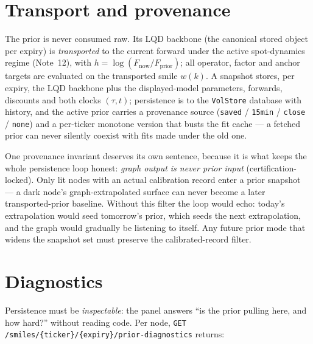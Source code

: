 \documentclass[11pt]{article}
\begin{document}
\section{Transport and provenance}
\label{sec:transport}

The prior is never consumed raw. Its LQD backbone (the canonical stored
object per expiry) is \emph{transported} to the current forward under the
active spot-dynamics regime (Note~12), with
$h=\log(F_{\text{now}}/F_{\text{prior}})$; all operator, factor and anchor
targets are evaluated on the transported smile $w(k)$. A snapshot stores, per
expiry, the LQD backbone plus the displayed-model parameters, forwards,
discounts and both clocks $(\tau,t)$; persistence is to the \texttt{VolStore}
database with history, and the active prior carries a provenance source
(\texttt{saved} / \texttt{15min} / \texttt{close} / \texttt{none}) and a
per-ticker monotone version that busts the fit cache --- a fetched prior can
never silently coexist with fits made under the old one.

One provenance invariant deserves its own sentence, because it is what keeps
the whole persistence loop honest: \emph{graph output is never prior input}
(certification-locked). Only lit nodes with an actual calibration record
enter a prior snapshot --- a dark node's graph-extrapolated surface can
never become a later transported-prior baseline. Without this filter the
loop would echo: today's extrapolation would seed tomorrow's prior, which
seeds the next extrapolation, and the graph would gradually be listening to
itself. Any future prior mode that widens the snapshot set must preserve
the calibrated-record filter.

\section{Diagnostics}
\label{sec:diagnostics}

Persistence must be \emph{inspectable}: the panel answers ``is the prior
pulling here, and how hard?'' without reading code. Per node,
\texttt{GET /smiles/\{ticker\}/\{expiry\}/prior-diagnostics} returns:
\end{document}
